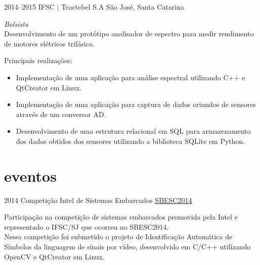 \documentclass[]{friggeri-cv} %
\begin{document}
\begin{entrylist}
\entry
{2014--2015}
{IFSC | Tractebel S.A}
{São José, Santa Catarina}
{\emph{Bolsista} \\
    
    Desenvolvimento de um protótipo analisador de espectro para medir rendimento de motores elétricos trifásico.

Principais realizações:\\

\begin{itemize}
    \item Implementação de uma aplicação para análise espectral utilizando C++ e QtCreator em Linux.
    \item Implementação de uma aplicação para captura de dados oriundos de sensores através de um conversor AD.
    \item Desenvolvimento de uma estrutura relacional em SQL para armazenamento dos dados obtidos dos sensores utilizando a biblioteca SQLite em Python.
\end{itemize}
}
\end{entrylist}
\pagebreak


\section{eventos}

\begin{entrylist}
\entry
{2014}
{Competição Intel de Sistemas Embarcados}
{\href{http://sbesc.lisha.ufsc.br/sbesc2014/Intel+Embedded+Systems+Competition}{SBESC2014}}
{
    
    Participação na competição de sistemas embarcados promovida pela Intel 
    e representado o IFSC/SJ que ocorreu no SBESC2014.\\

    Nessa competição foi submetido o projeto de Identificação Automática de Símbolos da linguagem de sinais por vídeo,
    desenvolvido em C/C++ utilizando OpenCV e QtCreator em Linux.

}
\end{entrylist}
\end{document}
